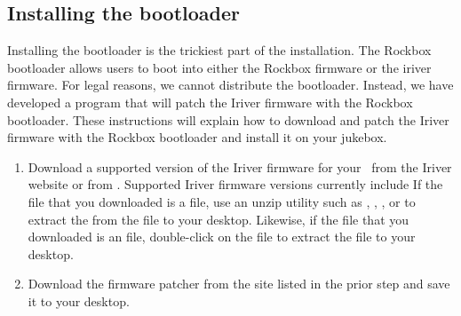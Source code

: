 \subsection{Installing the bootloader}
  Installing the bootloader is the trickiest part of the installation.
  The Rockbox bootloader allows users to boot into either the Rockbox 
  firmware or the iriver firmware. For legal reasons, we cannot distribute 
  the bootloader. Instead, we have developed a program that will patch the 
  Iriver firmware with the Rockbox bootloader. These instructions will explain 
  how to download and patch the Iriver firmware with the Rockbox bootloader 
  and install it on your jukebox.

\begin{enumerate}
  \item Download a supported version of the Iriver firmware for your 
  \playername\ from the Iriver website or from 
  .
  Supported Iriver firmware versions currently include 
  If the file that you downloaded is a  file, use an unzip 
  utility such as , , ,	or 
   to extract the  from the  file
  to your desktop. Likewise, if the file that you downloaded is an 
   file, double-click on the 	file to extract 
  the  file to your desktop.
  \item Download the firmware patcher  from the site 
  listed in the prior step and save it to your desktop.
\end{enumerate}
